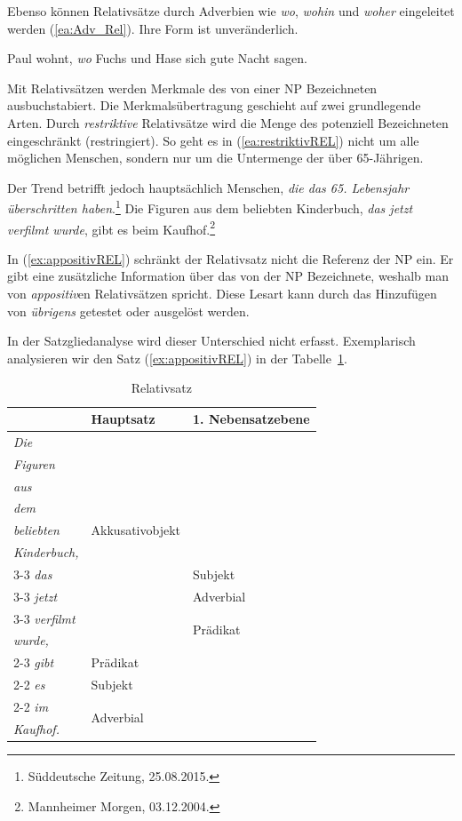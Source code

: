 Ebenso können Relativsätze durch Adverbien wie \textit{wo}, \textit{wohin} und \textit{woher} eingeleitet werden (\ref{ea:Adv_Rel}). Ihre Form ist unveränderlich.  

\ea \label{ea:Adv_Rel} Paul wohnt, \textit{wo} Fuchs und Hase sich gute Nacht sagen.
\z 

Mit Relativsätzen werden Merkmale des von einer NP Bezeichneten ausbuchstabiert. Die Merkmalsübertragung geschieht auf zwei grundlegende Arten. Durch \textit{restriktive} Relativsätze wird die Menge des potenziell Bezeichneten eingeschränkt (restringiert). So geht es in (\ref{ea:restriktivREL}) nicht um alle möglichen Menschen, sondern nur um die Untermenge der über 65-Jährigen. 

\ea \label{ea:restriktiv_appositiv}
\ea \label{ea:restriktivREL}  Der Trend betrifft jedoch hauptsächlich Menschen, \textit{die das 65. Lebensjahr überschritten haben}.\footnote{Süddeutsche Zeitung, 25.08.2015.}
\ex \label{ex:appositivREL} Die Figuren aus dem beliebten Kinderbuch, \textit{das jetzt verfilmt wurde}, gibt es beim Kaufhof.\footnote{Mannheimer Morgen, 03.12.2004.}
\z 
\z 

In (\ref{ex:appositivREL}) schränkt der Relativsatz nicht die Referenz der NP ein. Er gibt eine zusätzliche Information über das von der NP Bezeichnete, weshalb man von \textit{appositiv}en Relativsätzen spricht. Diese Lesart kann durch das Hinzufügen von \textit{übrigens} getestet oder ausgelöst werden. 


In der Satzgliedanalyse wird dieser Unterschied nicht erfasst. Exemplarisch analysieren wir den Satz (\ref{ex:appositivREL}) in der Tabelle~\ref{tab:Relativsatz}.

\begin{table}
  \centering
  \begin{tabular}{l|l|l}
        & Hauptsatz & 1. Nebensatzebene \\
    \hline
    \textit{Die} & \multirow{9}{*}{Akkusativobjekt} &  \\ 
    \textit{Figuren} & & \\
    \textit{aus} & & \\
    \textit{dem} & & \\ 
    \textit{beliebten} & & \\ 
    \textit{Kinderbuch,} & & \\ \cline{3-3}
    \textit{das} & & Subjekt \\ \cline{3-3}
    \textit{jetzt} & & Adverbial \\ \cline{3-3}
    \textit{verfilmt} & & \multirow{2}{*}{Prädikat} \\
    \textit{wurde,} & & \\ \cline{2-3} 
    \textit{gibt} & Prädikat & \\ \cline{2-2}
    \textit{es} & Subjekt & \\ \cline{2-2}
    \textit{im} & \multirow{2}{*}{Adverbial} &  \\   
    \textit{Kaufhof.} & & \\  
    \hline 
  \end{tabular}
  \caption{Relativsatz}
  \label{tab:Relativsatz}
\end{table}

